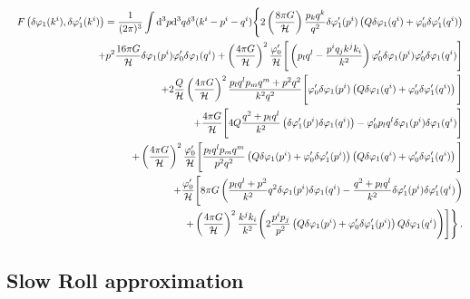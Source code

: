 \begin{eqnarray}
 \label{eq:Fdvk1-fourier-num}
&&%
F\left(\dvp1(\kvi),\dvp1'(\kvi)\right)
= \frac{1}{(2\pi)^3}\int \d^3p \d^3q\delta^3(\kvi-\pvi-\qvi) 
\Bigg\{ 
2\left(\frac{8\pi G}{\H}\right)\frac{p_kq^k}{q^2}
\delta\vp_{1}'(\pvi)\left(
Q\dvp1(\qvi)+\vp_{0}'\dvp1'(\qvi)\right)
\nonumber\\
&&
+p^2\frac{16\pi G}{\H}\dvp1(\pvi)\vp_{0}'\dvp1(\qvi)
+\left(\frac{4\pi G}{\H}\right)^2
\frac{\vp_{0}'}{\H}\Bigg[
\left(p_lq^l-\frac{p^iq_jk^jk_i}{k^2}\right) 
\vp_{0}'\delta\vp_{1}(\pvi)\vp_{0}'\delta\vp_{1}(\qvi)
\Bigg]\nonumber\\
&&
+2\frac{Q}{\H}\left(\frac{4\pi G}{\H}\right)^2 
\frac{p_lq^lp_mq^m+p^2q^2}{k^2q^2}
\Bigg[\vp_{0}'\delta\vp_{1}(\pvi)
\left(Q\dvp1(\qvi)+\vp_{0}'\dvp1'(\qvi)\right)
\Bigg]
%
\nonumber\\
%
&&
+\frac{4\pi G}{\H}
\Bigg[
4Q\frac{q^2+p_lq^l}{k^2}\left(
\dvp1'(\pvi)\dvp1(\qvi)\right)
-\vp_{0}'p_lq^l \delta\vp_{1}(\pvi)\delta\vp_{1}(\qvi)
\Bigg]
\nonumber\\
%
&&
+\left(\frac{4\pi G}{\H}\right)^2
\frac{\vp_{0}'}{\H}\Bigg[
\frac{p_lq^lp_mq^m}{p^2q^2}
\left( Q\dvp1(\pvi)+\vp_{0}'\dvp1'(\pvi)\right)
\left(Q\dvp1(\qvi)+\vp_{0}'\dvp1'(\qvi)\right)
\Bigg]\nonumber\\
%
&&
+\frac{\vp_{0}'}{\H}
\Bigg[
8\pi G\left(\frac{p_lq^l+p^2}{k^2}q^2\dvp1(\pvi)\dvp1(\qvi)
-\frac{q^2+p_lq^l}{k^2}\dvp1'(\pvi)\dvp1'(\qvi)
\right)
\nonumber\\
%
%
&&\qquad\qquad\qquad
+\left(\frac{4\pi G}{\H}\right)^2
\frac{k^jk_i}{k^2}\Bigg(
2\frac{p^ip_j}{p^2}
\left(Q\dvp1(\pvi)+\vp_{0}'\dvp1'(\pvi)\right)
Q\dvp1(\qvi)
\Bigg)\Bigg]
\Bigg\}\,.
\end{eqnarray}


\subsection{Slow Roll approximation}
\label{sec:slowroll}


